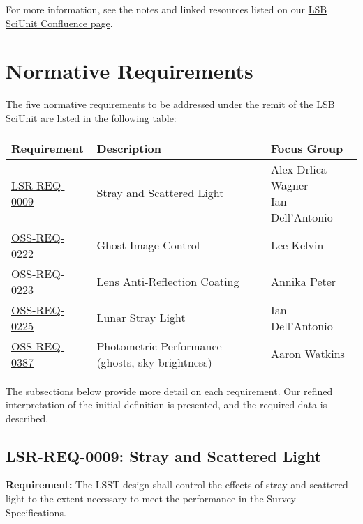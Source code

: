 \documentclass[SE,authoryear,toc]{lsstdoc}
\begin{document}
For more information, see the notes and linked resources listed on our \href{https://ls.st/sciunit-lsb}{LSB SciUnit Confluence page}.

\section{Normative Requirements}  \label{sec:requirements}

The five normative requirements to be addressed under the remit of the LSB SciUnit are listed in the following table:

\addtocounter{table}{-1}
\begin{longtable}{p{}p{}p{}}\hline
\textbf{Requirement} & \textbf{Description} & \textbf{Focus Group}  \\\hline
\href{https://docushare.lsst.org/docushare/dsweb/Get/LSE-29\#page=29}{LSR-REQ-0009} & Stray and Scattered Light & \Centerstack[l]{Alex Drlica-Wagner \\ Ian Dell'Antonio} \\
\href{https://docushare.lsst.org/docushare/dsweb/Get/LSE-30\#page=169}{OSS-REQ-0222} & Ghost Image Control & Lee Kelvin \\
\href{https://docushare.lsst.org/docushare/dsweb/Get/LSE-30\#page=170}{OSS-REQ-0223} & Lens Anti-Reflection Coating & Annika Peter \\
\href{https://docushare.lsst.org/docushare/dsweb/Get/LSE-30\#page=171}{OSS-REQ-0225} & Lunar Stray Light & Ian Dell'Antonio \\
\href{https://docushare.lsst.org/docushare/dsweb/Get/LSE-30\#page=124}{OSS-REQ-0387} & Photometric Performance (ghosts, sky brightness) & Aaron Watkins \\\hline
\end{longtable}

The subsections below provide more detail on each requirement. Our refined interpretation of the initial definition is presented, and the required data is described.

\subsection{LSR-REQ-0009: Stray and Scattered Light}  \label{sec:stray}

\textbf{Requirement:} The LSST design shall control the effects of stray and scattered light to the extent necessary to meet the performance in the Survey Specifications.
\end{document}

